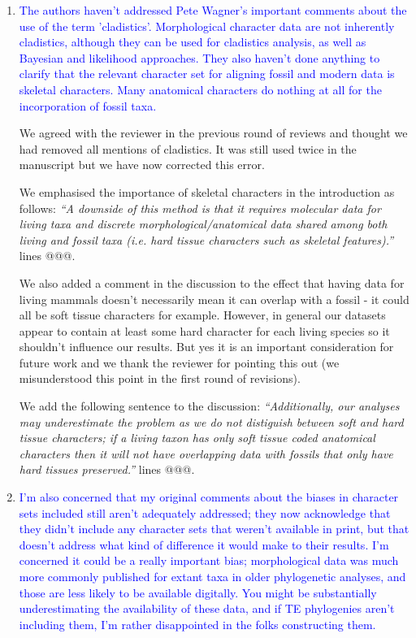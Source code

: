 \documentclass[12pt,letterpaper]{article}
\begin{document}
\begin{enumerate}
\item{\textcolor{blue}{The authors haven't addressed Pete Wagner's important comments about the use of the term 'cladistics'. Morphological character data are not inherently cladistics, although they can be used for cladistics analysis, as well as Bayesian and likelihood approaches. They also haven't done anything to clarify that the relevant character set for aligning fossil and modern data is skeletal characters. Many anatomical characters do nothing at all for the incorporation of fossil taxa.}}

We agreed with the reviewer in the previous round of reviews and thought we had removed all mentions of cladistics. It was still used twice in the manuscript but we have now corrected this error.

We emphasised the importance of skeletal characters in the introduction as follows:
\textit{``A downside of this method is that it requires molecular data for living taxa and discrete morphological/anatomical data shared among both living and fossil taxa (i.e. hard tissue characters such as skeletal features).''}
lines @@@.

We also added a comment in the discussion to the effect that having data for living mammals doesn't necessarily mean it can overlap with a fossil - it could all be soft tissue characters for example. However, in general our datasets appear to contain at least some hard character for each living species so it shouldn't influence our results. But yes it is an important consideration for future work and we thank the reviewer for pointing this out (we misunderstood this point in the first round of revisions). 

We add the following sentence to the discussion:
\textit{``Additionally, our analyses may underestimate the problem as we do not distiguish between soft and hard tissue characters; if a living taxon has only soft tissue coded anatomical characters then it will not have overlapping data with fossils that only have hard tissues preserved.''}
lines @@@.
\item{\textcolor{blue}{I'm also concerned that my original comments about the biases in character sets included still aren't adequately addressed; they now acknowledge that they didn't include any character sets that weren't available in print, but that doesn't address what kind of difference it would make to their results. I'm concerned it could be a really important bias; morphological data was much more commonly published for extant taxa in older phylogenetic analyses, and those are less likely to be available digitally. You might be substantially underestimating the availability of these data, and if TE phylogenies aren't including them, I'm rather disappointed in the folks constructing them. }}


\end{enumerate}
\end{document}
